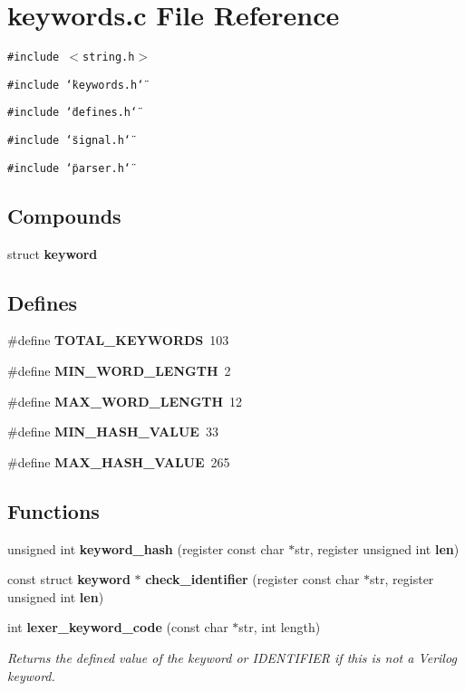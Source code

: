 \section{keywords.c File Reference}
\label{keywords_8c}
{\tt \#include $<$string.h$>$}\par
{\tt \#include \char`\"{}keywords.h\char`\"{}}\par
{\tt \#include \char`\"{}defines.h\char`\"{}}\par
{\tt \#include \char`\"{}signal.h\char`\"{}}\par
{\tt \#include \char`\"{}parser.h\char`\"{}}\par
\subsection*{Compounds}
\begin{CompactItemize}
\item 
struct {\bf keyword}
\end{CompactItemize}
\subsection*{Defines}
\begin{CompactItemize}
\item 
\#define {\bf TOTAL\_\-KEYWORDS}\ 103
\item 
\#define {\bf MIN\_\-WORD\_\-LENGTH}\ 2
\item 
\#define {\bf MAX\_\-WORD\_\-LENGTH}\ 12
\item 
\#define {\bf MIN\_\-HASH\_\-VALUE}\ 33
\item 
\#define {\bf MAX\_\-HASH\_\-VALUE}\ 265
\end{CompactItemize}
\subsection*{Functions}
\begin{CompactItemize}
\item 
unsigned int {\bf keyword\_\-hash} (register const char $\ast$str, register unsigned int {\bf len})
\item 
const struct {\bf keyword} $\ast$ {\bf check\_\-identifier} (register const char $\ast$str, register unsigned int {\bf len})
\item 
int {\bf lexer\_\-keyword\_\-code} (const char $\ast$str, int length)
\begin{CompactList}\small\item\em Returns the defined value of the keyword or IDENTIFIER if this is not a Verilog keyword. \item\end{CompactList}\end{CompactItemize}


